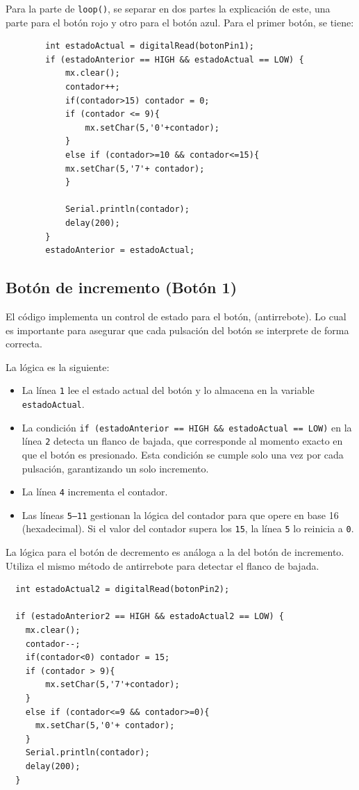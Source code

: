 \clearpage
Para la parte de \texttt{loop()}, se separar en dos partes la explicación de este, una parte para el botón rojo y otro para el botón azul. Para el primer botón, se tiene:

\begin{verbatim}
        int estadoActual = digitalRead(botonPin1);
        if (estadoAnterior == HIGH && estadoActual == LOW) {
            mx.clear();
            contador++;
            if(contador>15) contador = 0;
            if (contador <= 9){
                mx.setChar(5,'0'+contador);
            }
            else if (contador>=10 && contador<=15){
            mx.setChar(5,'7'+ contador);
            }
    
            Serial.println(contador);
            delay(200); 
        }
        estadoAnterior = estadoActual; 
    \end{verbatim}

\subsection*{Botón de incremento (Botón 1)}
El código implementa un control de estado para el botón, (antirrebote). Lo cual es importante para asegurar que cada pulsación del botón se interprete de forma correcta.

La lógica es la siguiente:
\begin{itemize}
    \item La línea \texttt{1} lee el estado actual del botón y lo almacena en la variable \texttt{estadoActual}.
    \item La condición \texttt{if (estadoAnterior == HIGH \&\& estadoActual == LOW)} en la línea \texttt{2} detecta un flanco de bajada, que corresponde al momento exacto en que el botón es presionado. Esta condición se cumple solo una vez por cada pulsación, garantizando un solo incremento.
    \item La línea \texttt{4} incrementa el contador.
    \item Las líneas \texttt{5--11} gestionan la lógica del contador para que opere en base 16 (hexadecimal). Si el valor del contador supera los \texttt{15}, la línea \texttt{5} lo reinicia a \texttt{0}.
\end{itemize}

La lógica para el botón de decremento es análoga a la del botón de incremento. Utiliza el mismo método de antirrebote para detectar el flanco de bajada.
\clearpage
\begin{listing}[H]
    \begin{verbatim}
  int estadoActual2 = digitalRead(botonPin2);
 
  if (estadoAnterior2 == HIGH && estadoActual2 == LOW) {
    mx.clear();
    contador--;
    if(contador<0) contador = 15;
    if (contador > 9){
        mx.setChar(5,'7'+contador);
    }
    else if (contador<=9 && contador>=0){
      mx.setChar(5,'0'+ contador);
    }
    Serial.println(contador);
    delay(200); 
  }
    \end{verbatim}
\end{listing}

